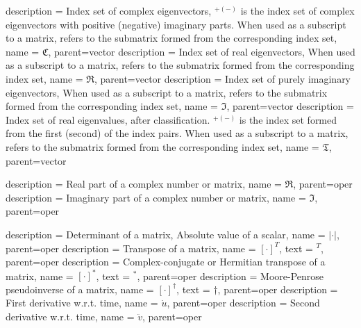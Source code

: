 {
	description = {Index set of complex eigenvectors, 
	\ensuremath{^{+(-)}} is the index set of complex eigenvectors with 
	positive (negative) imaginary parts. When used as a subscript to a matrix, refers 
	to the submatrix formed from the corresponding index set}, 
	name = {\ensuremath{\mathfrak{C}}},
	parent=vector
}
{
	description = {Index set of real eigenvectors,
	When used as a subscript to a matrix, refers to the submatrix formed from 
	the corresponding index set}, 
	name = {\ensuremath{\mathfrak{R}}},
	parent=vector
}
{
	description = {Index set of purely imaginary eigenvectors, 
	When used as a subscript to a matrix, refers to the submatrix formed from
	the corresponding index set}, 
	name = {\ensuremath{\mathfrak{I}}},
	parent=vector
}
{
	description = {Index set of real eigenvalues, after classification.
	\ensuremath{^{+(-)}} is the index set formed from the first 
	(second) of the index pairs.
	When used as a subscript to a matrix, refers to the submatrix formed from
	the corresponding index set}, 
	name = {\ensuremath{\mathfrak{T}}},
	parent=vector
}

{
	description = {Real part of a complex number or matrix}, 
	name = {\ensuremath{\Re}},
	parent=oper
}
{
	description = {Imaginary part of a complex number or matrix}, 
	name = {\ensuremath{\Im}},
	parent=oper
}

{
	description = {Determinant of a matrix, Absolute value of a scalar}, 
	name = {\ensuremath{\vert\cdot\vert}},
	parent=oper
}
{
	description = {Transpose of a matrix}, 
	name = {\ensuremath{\left[\cdot\right]^T}},
	text = {\ensuremath{^T}},
	parent=oper
}
{
	description = {Complex-conjugate or Hermitian transpose of a matrix}, 
	name = {\ensuremath{\left[\cdot\right]^*}},
	text = {\ensuremath{^*}},
	parent=oper
}
{
	description = {Moore-Penrose pseudoinverse of a matrix}, 
	name = {\ensuremath{\left[\cdot\right]^\dagger}},
	text = {\ensuremath{\dagger}},	
	parent=oper
}
{
	description = {First derivative w.r.t. time}, 
	name = {\ensuremath{\dot{u}}},
	parent=oper
}
{
	description = {Second derivative w.r.t. time}, 
	name = {\ensuremath{\ddot{v}}},
	parent=oper
}

